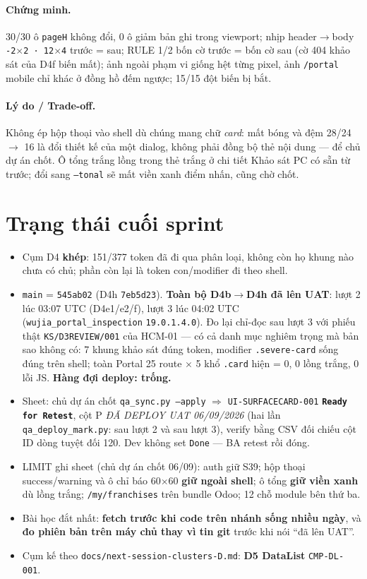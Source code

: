 \paragraph{Chứng minh.} 30/30 ô \texttt{pageH} không đổi, 0 ô giảm bản ghi trong viewport; nhịp
header$\to$body \texttt{-2$\times$2 · 12$\times$4} trước = sau; RULE 1/2 bốn cờ trước = bốn cờ
sau (cờ 404 khảo sát của D4f biến mất); ảnh ngoài phạm vi giống hệt từng pixel, ảnh
\texttt{/portal} mobile chỉ khác ở đồng hồ đếm ngược; 15/15 đột biến bị bắt.

\paragraph{Lý do / Trade-off.} Không ép hộp thoại vào shell dù chúng mang chữ \emph{card}: mất
bóng và đệm 28/24 $\to$ 16 là đổi thiết kế của một dialog, không phải đồng bộ thẻ nội dung --- để
chủ dự án chốt. Ô tổng trắng lồng trong thẻ trắng ở chi tiết Khảo sát PC có sẵn từ trước; đổi
sang \texttt{--tonal} sẽ mất viền xanh điểm nhấn, cũng chờ chốt.

\section{Trạng thái cuối sprint}

\begin{itemize}
\item Cụm D4 \textbf{khép}: 151/377 token đã đi qua phân loại, không còn họ khung nào chưa có
  chủ; phần còn lại là token con/modifier đi theo shell.
\item \texttt{main} = \texttt{545ab02} (D4h \texttt{7eb5d23}). \textbf{Toàn bộ D4b$\to$D4h đã lên
  UAT}: lượt 2 lúc 03:07 UTC (D4e1/e2/f), lượt 3 lúc 04:02 UTC (\texttt{wujia\_portal\_inspection}
  \texttt{19.0.1.4.0}). Đo lại chỉ-đọc sau lượt 3 với phiếu thật \texttt{KS/D3REVIEW/001} của
  HCM-01 --- có cả danh mục nghiêm trọng mà bản sao không có: 7 khung khảo sát đúng token,
  modifier \texttt{.severe-card} sống đúng trên shell; toàn Portal 25 route $\times$ 5 khổ
  \texttt{.card} hiện = 0, 0 lồng trắng, 0 lỗi JS. \textbf{Hàng đợi deploy: trống.}
\item Sheet: chủ dự án chốt \texttt{qa\_sync.py --apply} $\Rightarrow$ \texttt{UI-SURFACECARD-001}
  \textbf{\texttt{Ready for Retest}}, cột P \emph{ĐÃ DEPLOY UAT 06/09/2026} (hai lần
  \texttt{qa\_deploy\_mark.py}: sau lượt 2 và sau lượt 3), verify bằng CSV đối chiếu cột ID dòng
  tuyệt đối 120. Dev không set \texttt{Done} --- BA retest rồi đóng.
\item LIMIT ghi sheet (chủ dự án chốt 06/09): auth giữ S39; hộp thoại success/warning và ô chỉ báo
  60$\times$60 \textbf{giữ ngoài shell}; ô tổng \textbf{giữ viền xanh} dù lồng trắng;
  \texttt{/my/franchises} trên bundle Odoo; 12 chỗ module bên thứ ba.
\item Bài học đắt nhất: \textbf{fetch trước khi code trên nhánh sống nhiều ngày}, và
  \textbf{đo phiên bản trên máy chủ thay vì tin git} trước khi nói ``đã lên UAT''.
\item Cụm kế theo \texttt{docs/next-session-clusters-D.md}: \textbf{D5 DataList} \texttt{CMP-DL-001}.
\end{itemize}
